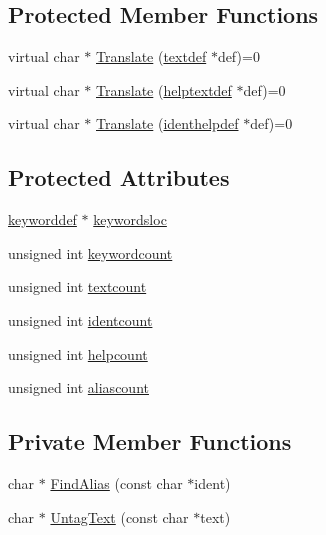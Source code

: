 \subsection*{Protected Member Functions}
\begin{DoxyCompactItemize}
\item 
virtual char $\ast$ \hyperlink{classLanguage_ae4515a9a4191e57c5ccab61e99687818}{Translate} (\hyperlink{structtextdef}{textdef} $\ast$def)=0
\item 
virtual char $\ast$ \hyperlink{classLanguage_aa51c505262ca738bf4675fc87f96dbf6}{Translate} (\hyperlink{structhelptextdef}{helptextdef} $\ast$def)=0
\item 
virtual char $\ast$ \hyperlink{classLanguage_a232a8b51c7866013363b9916fe89299c}{Translate} (\hyperlink{structidenthelpdef}{identhelpdef} $\ast$def)=0
\end{DoxyCompactItemize}
\subsection*{Protected Attributes}
\begin{DoxyCompactItemize}
\item 
\hyperlink{structkeyworddef}{keyworddef} $\ast$ \hyperlink{classLanguage_a14560ed53cf2860b61199d2882c52f67}{keywordsloc}
\item 
unsigned int \hyperlink{classLanguage_ab392fc18ba79a2a47bdde99eec400aa1}{keywordcount}
\item 
unsigned int \hyperlink{classLanguage_ac648059e4bb481a66c5a075ab8684cb8}{textcount}
\item 
unsigned int \hyperlink{classLanguage_a470e68c0f7517f8f8ffa9ba315b52b0a}{identcount}
\item 
unsigned int \hyperlink{classLanguage_a9eb566a53c9e64a9abd406a77e97d2f0}{helpcount}
\item 
unsigned int \hyperlink{classLanguage_ac7bd12392a659fa797e123a0d84414e5}{aliascount}
\end{DoxyCompactItemize}
\subsection*{Private Member Functions}
\begin{DoxyCompactItemize}
\item 
char $\ast$ \hyperlink{classLanguage_a14a991ea42d5d0482911d459ee68e8be}{Find\+Alias} (const char $\ast$ident)
\item 
char $\ast$ \hyperlink{classLanguage_a69c5b3269ec8570a2f8f28e8e632cf44}{Untag\+Text} (const char $\ast$text)
\end{DoxyCompactItemize}
